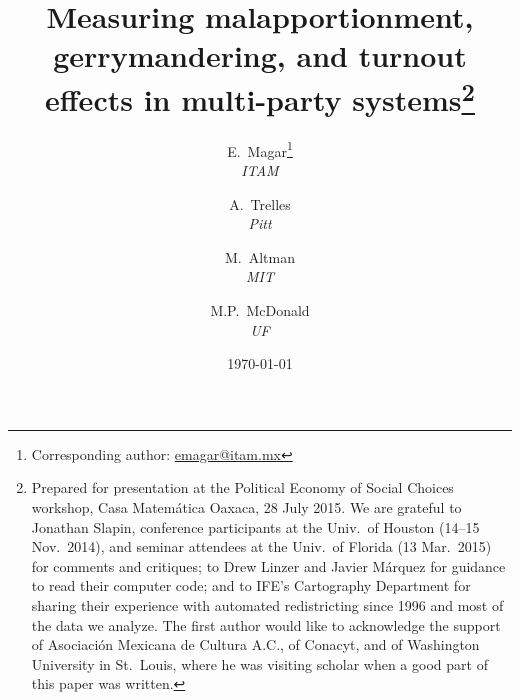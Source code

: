 \documentclass[letter,12pt]{article}
\begin{document}
\title{Measuring malapportionment, gerrymandering, and turnout effects in multi-party systems\thanks{Prepared for presentation at the Political Economy of Social Choices workshop, Casa Matem\'atica Oaxaca, 28 July 2015. We are grateful to Jonathan Slapin, conference participants at the Univ.\ of Houston (14--15 Nov.\ 2014), and seminar attendees at the Univ.\ of Florida (13 Mar.\ 2015) for comments and critiques; to Drew Linzer and Javier M\'arquez for guidance to read their computer code; and to IFE's Cartography Department for sharing their experience with automated redistricting since 1996 and most of the data we analyze. The first author would like to acknowledge the support of Asociaci\'on Mexicana de Cultura A.C., of Conacyt, and of Washington University in St.\ Louis, where he was visiting scholar when a good part of this paper was written.}}
\author{E.~Magar\footnote{Corresponding author: \url{emagar@itam.mx}} \\ \emph{ITAM} \and
        A.~Trelles \\ \emph{Pitt} \and  
        M.~Altman \\ \emph{MIT} \and
        M.P.~McDonald \\ \emph{UF} 
      }
\date{\today}
\maketitle


\end{document}
